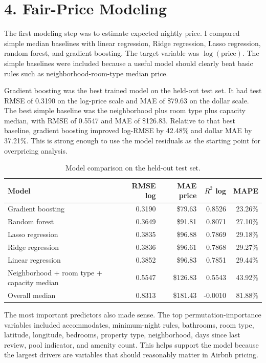 \documentclass[11pt]{article}
\begin{document}
\section*{4. Fair-Price Modeling}

The first modeling step was to estimate expected nightly price. I compared simple median baselines with linear regression, Ridge regression, Lasso regression, random forest, and gradient boosting. The target variable was $\log(\text{price})$. The simple baselines were included because a useful model should clearly beat basic rules such as neighborhood-room-type median price.

Gradient boosting was the best trained model on the held-out test set. It had test RMSE of 0.3190 on the log-price scale and MAE of \$79.63 on the dollar scale. The best simple baseline was the neighborhood plus room type plus capacity median, with RMSE of 0.5547 and MAE of \$126.83. Relative to that best baseline, gradient boosting improved log-RMSE by 42.48\% and dollar MAE by 37.21\%. This is strong enough to use the model residuals as the starting point for overpricing analysis.

\begin{table}[H]
\centering
\caption{Model comparison on the held-out test set.}
\small
\begin{tabular}{L{0.43\textwidth}rrrr}
\toprule
Model & RMSE log & MAE price & $R^2$ log & MAPE \\
\midrule
Gradient boosting & 0.3190 & \$79.63 & 0.8526 & 23.26\% \\
Random forest & 0.3649 & \$91.81 & 0.8071 & 27.10\% \\
Lasso regression & 0.3835 & \$96.88 & 0.7869 & 29.18\% \\
Ridge regression & 0.3836 & \$96.61 & 0.7868 & 29.27\% \\
Linear regression & 0.3852 & \$96.83 & 0.7851 & 29.44\% \\
Neighborhood + room type + capacity median & 0.5547 & \$126.83 & 0.5543 & 43.92\% \\
Overall median & 0.8313 & \$181.43 & -0.0010 & 81.88\% \\
\bottomrule
\end{tabular}
\end{table}

The most important predictors also made sense. The top permutation-importance variables included accommodates, minimum-night rules, bathrooms, room type, latitude, longitude, bedrooms, property type, neighborhood, days since last review, pool indicator, and amenity count. This helps support the model because the largest drivers are variables that should reasonably matter in Airbnb pricing.
\end{document}

